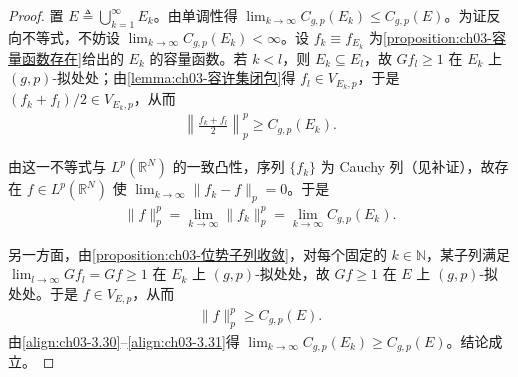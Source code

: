 \documentclass[../../main.tex]{subfiles}%
\begin{document}
\begin{proof}
置 $E\triangleq\bigcup_{k=1}^\infty E_k$。由单调性得 $\lim_{k\to\infty}C_{g,p}(E_k)\leqslant C_{g,p}(E)$。为证反向不等式，不妨设 $\lim_{k\to\infty}C_{g,p}(E_k)<\infty$。设 $f_k\equiv f_{E_k}$ 为\cref{proposition:ch03-容量函数存在}给出的 $E_k$ 的容量函数。若 $k<l$，则 $E_k\subseteq E_l$，故 $Gf_l\geqslant1$ 在 $E_k$ 上 $(g,p)$-拟处处；由\cref{lemma:ch03-容许集闭包}得 $f_l\in V_{E_k,p}$，于是 $(f_k+f_l)/2\in V_{E_k,p}$，从而
\begin{align*}
\left\|\frac{f_k+f_l}{2}\right\|_p^p\geqslant C_{g,p}(E_k).
\end{align*}

由这一不等式与 $L^p(\mathbb{R}^N)$ 的一致凸性，序列 $\{f_k\}$ 为 Cauchy 列（见补证），故存在 $f\in L^p(\mathbb{R}^N)$ 使 $\lim_{k\to\infty}\|f_k-f\|_p=0$。于是
\begin{align}
\|f\|_p^p=\lim_{k\to\infty}\|f_k\|_p^p=\lim_{k\to\infty}C_{g,p}(E_k).\label{align:ch03-3.30}
\end{align}

另一方面，由\cref{proposition:ch03-位势子列收敛}，对每个固定的 $k\in\mathbb{N}$，某子列满足 $\lim_{l\to\infty}Gf_l=Gf\geqslant1$ 在 $E_k$ 上 $(g,p)$-拟处处，故 $Gf\geqslant1$ 在 $E$ 上 $(g,p)$-拟处处。于是 $f\in V_{E,p}$，从而
\begin{align}
\|f\|_p^p\geqslant C_{g,p}(E).\label{align:ch03-3.31}
\end{align}
由\eqref{align:ch03-3.30}--\eqref{align:ch03-3.31}得 $\lim_{k\to\infty}C_{g,p}(E_k)\geqslant C_{g,p}(E)$。结论成立。
\end{proof}
\end{document}
